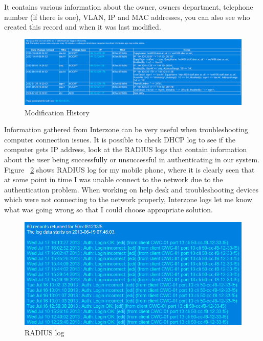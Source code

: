 \documentclass[10pt,a4paper,headinclude=true]{report}
\begin{document}
It contains various information about the owner, owners department, telephone number (if there is one), VLAN, IP and MAC addresses, you can also see who created this record and when it was last modified.

\begin{figure}[H]
\centering
\centerline{\includegraphics[scale=0.5]{./modification_history}}
\caption{Modification History}
\label{fig:modification_history}
\end{figure}

Information gathered from Interzone can be very useful when troubleshooting computer connection issues. It is possible to check DHCP log to see if the computer gets IP address, look at the RADIUS logs that contain information about the user being successfully or unsuccessful in authenticating in our system. Figure ~\ref{fig:interzone_radius} shows RADIUS log for my mobile phone, where it is clearly seen that at some point in time I was unable connect to the network due to the authentication problem. When working on help desk and troubleshooting devices which were not connecting to the network properly, Interzone logs let me know what was going wrong so that I could choose appropriate solution. 

\begin{figure}[H]
\centering
\centerline{\includegraphics[scale=0.5]{./interzone_radius}}
\caption{RADIUS log}
\label{fig:interzone_radius}
\end{figure}
\end{document}
